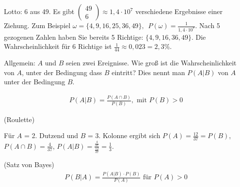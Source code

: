 Lotto: 6 aus 49. Es gibt $\begin{pmatrix}49\\6\end{pmatrix} \approx 1,4\cdot 10^7$ verschiedene Ergebnisse einer Ziehung. Zum Beispiel $\omega = \{4, 9, 16, 25, 36, 49\},\enspace P(\omega) = \frac{1}{1,4\cdot 10^7}$. Nach 5 gezogenen Zahlen haben Sie bereits 5 Richtige: $\{4, 9, 16, 36, 49\}$. Die Wahrscheinlichkeit für 6 Richtige ist $\frac{1}{44} \approx 0,023 = 2,3\%{}$.

\bigskip
Allgemein: $A$ und $B$ seien zwei Ereignisse. Wie groß ist die Wahrscheinlichkeit von $A$, unter der Bedingung dass $B$ eintritt? Dies nennt man  $P(A|B)$ von $A$ unter der Bedingung $B$.

\begin{align*}
    P(A|B) = \frac{P(A \cap B)}{P(B)},\text{ mit }P(B) > 0
\end{align*}

 (Roulette)

Für $A$ = 2. Dutzend und $B$ = 3. Kolonne ergibt sich $P(A) = \frac{12}{37} = P(B)$, $P(A \cap B) = \frac{4}{37}$, $P(A|B) = \frac{\frac{4}{37}}{\frac{12}{37}} = \frac{1}{3}$.

 (Satz von Bayes)
\begin{align*}
    P(B|A) = \frac{P(A|B) \cdot P(B)}{P(A)}\text{ für }P(A) > 0
\end{align*}

